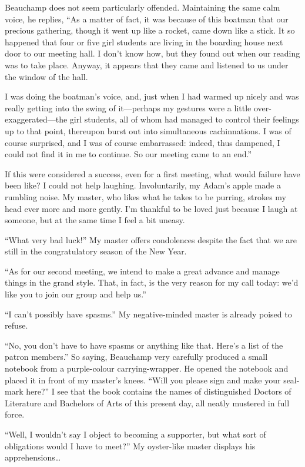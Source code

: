 \documentclass{book}
\begin{document}
Beauchamp does not seem particularly offended. Maintaining the same calm
voice, he replies, ``As a matter of fact, it was because of this boatman
that our precious gathering, though it went up like a rocket, came down
like a stick. It so happened that four or five girl students are living
in the boarding house next door to our meeting hall. I don't know how,
but they found out when our reading was to take place. Anyway, it
appears that they came and listened to us under the window of the hall.

I was doing the boatman's voice, and, just when I had warmed up nicely
and was really getting into the swing of it---perhaps my gestures were a
little over-exaggerated---the girl students, all of whom had managed to
control their feelings up to that point, thereupon burst out into
simultaneous cachinnations. I was of course surprised, and I was of
course embarrassed: indeed, thus dampened, I could not find it in me to
continue. So our meeting came to an end.''

If this were considered a success, even for a first meeting, what would
failure have been like? I could not help laughing. Involuntarily, my
Adam's apple made a rumbling noise. My master, who likes what he takes
to be purring, strokes my head ever more and more gently. I'm thankful
to be loved just because I laugh at someone, but at the same time I feel
a bit uneasy.

``What very bad luck!'' My master offers condolences despite the fact
that we are still in the congratulatory season of the New Year.

``As for our second meeting, we intend to make a great advance and
manage things in the grand style. That, in fact, is the very reason for
my call today: we'd like you to join our group and help us.''

``I can't possibly have spasms.'' My negative-minded master is already
poised to refuse.

``No, you don't have to have spasms or anything like that. Here's a list
of the patron members.'' So saying, Beauchamp very carefully produced a
small notebook from a purple-colour carrying-wrapper. He opened the
notebook and placed it in front of my master's knees. ``Will you please
sign and make your seal-mark here?'' I see that the book contains the
names of distinguished Doctors of Literature and Bachelors of Arts of
this present day, all neatly mustered in full force.

``Well, I wouldn't say I object to becoming a supporter, but what sort
of obligations would I have to meet?'' My oyster-like master displays
his apprehensions\ldots{}
\end{document}
